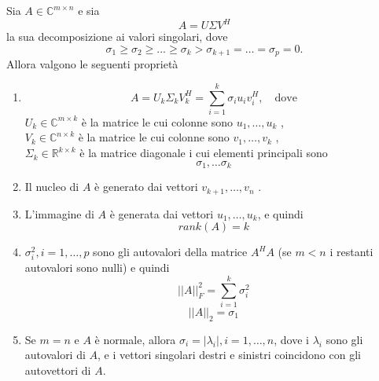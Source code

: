 \begin{theo}
\label{eq:06minq33}
 Sia $A \in \mathbb{C}^{m \times n}$ e sia
$$A = U\Sigma V^{H}$$
la sua decomposizione ai valori singolari, dove
$$\sigma_1 \geq \sigma_2 \geq . . .
 \geq \sigma_k > \sigma_{k+1} = \ldots = \sigma_p = 0.
$$
Allora valgono le seguenti propriet\`a
\begin{enumerate}
\item
$$ A = U_k \Sigma_k V_k^{H}
= \displaystyle \sum_{i=1}^{k} \sigma_i u_i v_i^{H} , \quad \text{
dove}
$$
$U_k \in \mathbb{C}^{m\times k}$ \`e la matrice le cui colonne sono
$u_1 , \ldots , u_k$ , \\ $V_k \in \mathbb{C}^{n×k}$ \`e la matrice le
cui colonne sono $v_1 , \ldots, v_k$ , \\ $\Sigma_k \in
\mathbb{R}^{k\times k}$ \`e la matrice diagonale i cui elementi
principali sono
$$ \sigma_1, \ldots \sigma_k$$

\item Il nucleo di $A$ \`e generato dai vettori $v_{k+1} ,\ldots ,
v_n$ .

\item L'immagine di $A$ \`e generata dai vettori $u_1, \ldots , u_k$,
e quindi
$$rank(A) = k$$
\item

 $\sigma_i^{2} , i = 1, \ldots, p$ sono gli autovalori della matrice
$A^H A$ (se $m < n$ i restanti autovalori sono nulli) e quindi
$$
||A||_{F}^{2} = \displaystyle \sum_{i=1}^{k} \sigma_i^{2}
$$
$$||A||_2 = \sigma_1 $$

\item Se $m = n$ e $A$ \`e normale, allora $\sigma_i = |\lambda_i |,
i = 1, \ldots , n$, dove i $\lambda_i$ sono gli autovalori di $A$, e i
vettori singolari destri e sinistri coincidono con gli autovettori di
$A$.
\end{enumerate}

\end{theo}

